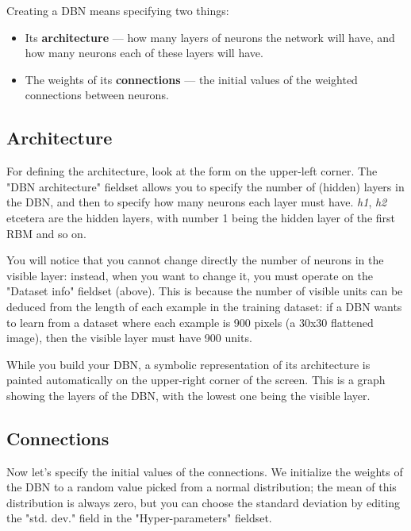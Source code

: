 \documentclass[a4paper]{article}
\begin{document}
		
Creating a DBN means specifying two things:
		
	\begin{itemize}
		
			
	\item Its \textbf{architecture} --- how many layers of neurons the network will have, and how many neurons each of these layers will have.
			
	\item The weights of its \textbf{connections} --- the initial values of the weighted connections between neurons.
		
	\end{itemize}


		
	\subsection{Architecture}

		
For defining the architecture, look at the form on the upper-left corner. The "DBN architecture" fieldset allows you to specify the number of (hidden) layers in the DBN, and then to specify how many neurons each layer must have. \emph{h1}, \emph{h2} etcetera are the hidden layers, with number 1 being the hidden layer of the first RBM and so on.
		
You will notice that you cannot change directly the number of neurons in the visible layer: instead, when you want to change it, you must operate on the "Dataset info" fieldset (above). This is because the number of visible units can be deduced from the length of each example in the training dataset: if a DBN wants to learn from a dataset where each example is 900 pixels (a 30x30 flattened image), then the visible layer must have 900 units.
		
While you build your DBN, a symbolic representation of its architecture is painted automatically on the upper-right corner of the screen. This is a graph showing the layers of the DBN, with the lowest one being the visible layer.

		
	\subsection{Connections}

		
Now let's specify the initial values of the connections. We initialize the weights of the DBN to a random value picked from a normal distribution; the mean of this distribution is always zero, but you can choose the standard deviation by editing the "std. dev." field in the "Hyper-parameters" fieldset.
		
\end{document}
